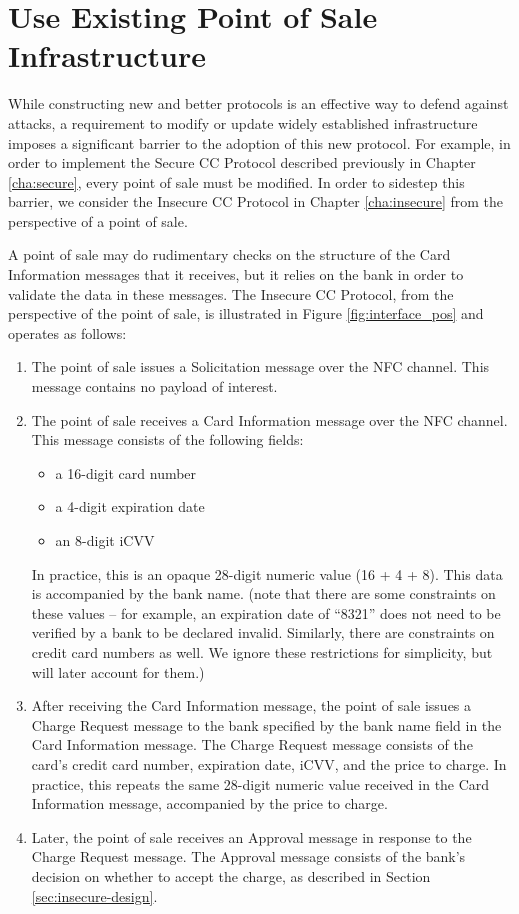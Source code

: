 \section{Use Existing Point of Sale Infrastructure}
\label{sec:goals-infrastructure}

While constructing new and better protocols is an effective way to defend against attacks,
	a requirement to modify or update widely established infrastructure imposes a significant barrier to the adoption of this new protocol.
For example, in order to implement the Secure CC Protocol described previously in Chapter \ref{cha:secure}, every point of sale must be modified.
In order to sidestep this barrier, we consider the Insecure CC Protocol in Chapter \ref{cha:insecure} from the perspective of a point of sale.

A point of sale may do rudimentary checks on the structure of the Card Information messages that it receives,
	but it relies on the bank in order to validate the data in these messages.
The Insecure CC Protocol, from the perspective of the point of sale, is illustrated in Figure \ref{fig:interface_pos} and operates as follows:

\begin{enumerate}
\item The point of sale issues a Solicitation message over the NFC channel.
	This message contains no payload of interest.
\item The point of sale receives a Card Information message over the NFC channel.
	This message consists of the following fields:
	\begin{itemize}
	\item a 16-digit card number
	\item a 4-digit expiration date
	\item an 8-digit iCVV
	\end{itemize}
	In practice, this is an opaque 28-digit numeric value (16 + 4 + 8).
	This data is accompanied by the bank name.
	(note that there are some constraints on these values -- for example, an expiration date of ``8321'' does not need to be verified by a bank to be declared invalid.
	Similarly, there are constraints on credit card numbers as well.
	We ignore these restrictions for simplicity, but will later account for them.)
\item After receiving the Card Information message,
	the point of sale issues a Charge Request message to the bank specified by the bank name field in the Card Information message.
	The Charge Request message consists of the card's credit card number, expiration date, iCVV, and the price to charge.
	In practice, this repeats the same 28-digit numeric value received in the Card Information message, accompanied by the price to charge.
\item Later, the point of sale receives an Approval message in response to the Charge Request message.
	The Approval message consists of the bank's decision on whether to accept the charge, as described in Section \ref{sec:insecure-design}.
\end{enumerate}

